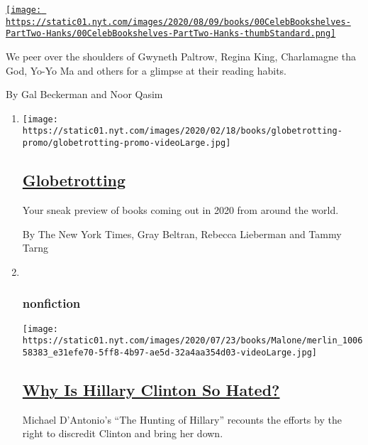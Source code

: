 \begin{enumerate}
\begin{enumerate}
    \href{/2020/07/27/books/tom-hanks-gwyneth-paltrow-bookshelves.html}{\texttt{[image: https://static01.nyt.com/images/2020/08/09/books/00CelebBookshelves-PartTwo-Hanks/00CelebBookshelves-PartTwo-Hanks-thumbStandard.png]}}

    We peer over the shoulders of Gwyneth Paltrow, Regina King,
    Charlamagne tha God, Yo-Yo Ma and others for a glimpse at their
    reading habits.

    By Gal Beckerman and Noor Qasim
  \end{enumerate}
\end{enumerate}

\begin{enumerate}
\def\labelenumi{\arabic{enumi}.}
\item
  \texttt{[image: https://static01.nyt.com/images/2020/02/18/books/globetrotting-promo/globetrotting-promo-videoLarge.jpg]}

  \hypertarget{globetrotting}{%
  \subsection{\texorpdfstring{\href{/interactive/2020/01/08/books/new-books-international.html}{Globetrotting}}{Globetrotting}}\label{globetrotting}}

  Your sneak preview of books coming out in 2020 from around the world.

  By The New York Times, Gray Beltran, Rebecca Lieberman and Tammy Tarng
\item ~
  \hypertarget{nonfiction}{%
  \subsubsection{nonfiction}\label{nonfiction}}

  \texttt{[image: https://static01.nyt.com/images/2020/07/23/books/Malone/merlin\_100658383\_e31efe70-5ff8-4b97-ae5d-32a4aa354d03-videoLarge.jpg]}

  \hypertarget{why-is-hillary-clinton-so-hated}{%
  \subsection{\texorpdfstring{\href{/2020/07/28/books/review/the-hunting-of-hillary-michael-dantonio.html}{Why
  Is Hillary Clinton So
  Hated?}}{Why Is Hillary Clinton So Hated?}}\label{why-is-hillary-clinton-so-hated}}

  Michael D'Antonio's ``The Hunting of Hillary'' recounts the efforts by
  the right to discredit Clinton and bring her down.


\end{enumerate}
